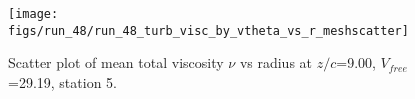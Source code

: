 \begin{figure}[H]
\centering
\texttt{[image: figs/run\_48/run\_48\_turb\_visc\_by\_vtheta\_vs\_r\_meshscatter]}
\caption{Scatter plot of mean total viscosity $\nu$ vs radius at $z/c$=9.00, $V_{free}$=29.19, station 5.}
\label{fig:run_48_turb_visc_by_vtheta_vs_r_meshscatter}
\end{figure}


